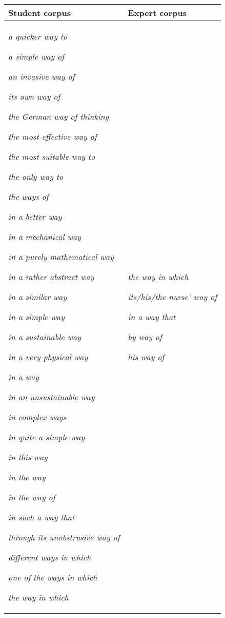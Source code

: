 \documentclass[12pt]{article}
\begin{document}
\begin{center}
\tablefirsthead{}
\tablehead{}
\tabletail{}
\tablelasttail{}
\begin{supertabular}{m{2.2726598in}m{2.2893598in}}
\hline
Student corpus  &
Expert corpus\\\hline
\textit{a quicker way to }

\textit{a simple way of}

\textit{an invasive way of}

\textit{its own way of}

\textit{the German way of thinking}

\textit{the most effective way of}

\textit{the most suitable way to}

\textit{the only way to}

\textit{the ways of }

\textit{in a better way }

\textit{in a mechanical way}

\textit{in a purely mathematical way}

\textit{in a rather abstract way}

\textit{in a similar way}

\textit{in a simple way}

\textit{in a sustainable way}

\textit{in a very physical way}

\textit{in a way}

\textit{in an unsustainable way}

\textit{in complex ways}

\textit{in quite a simple way}

\textit{in this way}

\textit{in the way}

\textit{in the way of}

\textit{in such a way that}

\textit{through its unobstrusive way of}

\textit{different ways in which}

\textit{one of the ways in which}

\textit{the way in which} &
\textit{the way in which}

\textit{its/his/the nurse’ way of }

\textit{in a way that}

\textit{by way of}

\textit{his way of }


\end{supertabular}
\end{center}
\end{document}
